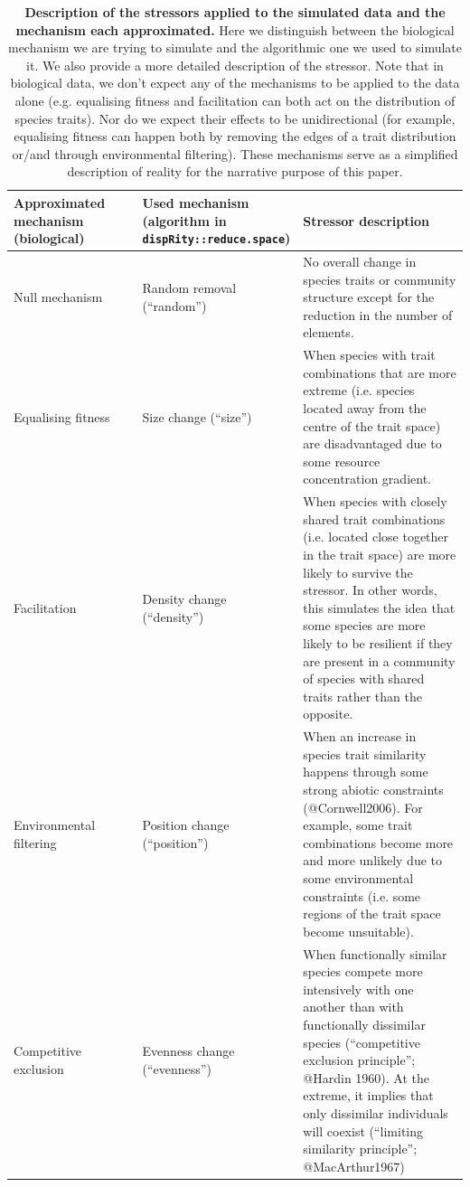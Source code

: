 \documentclass[12pt,letterpaper]{article}
\begin{document}
\begin{table}
\center
\scriptsize
\begin{tabular}{p{0.3\linewidth}|p{0.3\linewidth}|p{0.4\linewidth}}
\textbf{Approximated mechanism (biological)} & \textbf{Used mechanism (algorithm in \texttt{dispRity::reduce.space})} & \textbf{Stressor description}\\
\hline
  Null mechanism & Random removal (“random”) & No overall change in species traits or community structure except for the reduction in the number of elements.\\
  Equalising fitness & Size change (“size”) & When species with trait combinations that are more extreme (i.e. species located away from the centre of the trait space) are disadvantaged due to some resource concentration gradient. \\
  Facilitation & Density change (“density”) & When species with closely shared trait combinations (i.e. located close together in the trait space) are more likely to survive the stressor. In other words, this simulates the idea that some species are more likely to be resilient if they are present in a community of species with shared traits rather than the opposite.\\
  Environmental filtering & Position change (“position”) & When an increase in species trait similarity happens through some strong abiotic constraints (@Cornwell2006). For example, some trait combinations become more and more unlikely due to some environmental constraints (i.e. some regions of the trait space become unsuitable).\\
  Competitive exclusion & Evenness change (“evenness”) & When functionally similar species compete more intensively with one another than with functionally dissimilar species (``competitive exclusion principle''; @Hardin 1960). At the extreme, it implies that only dissimilar individuals will coexist (``limiting similarity principle''; @MacArthur1967)\\

    \end{tabular}
    \caption{\scriptsize{\textbf{Description of the stressors applied to the simulated data and the mechanism each approximated.} Here we distinguish between the biological mechanism we are trying to simulate and the algorithmic one we used to simulate it. We also provide a more detailed description of the stressor. Note that in biological data, we don’t expect any of the mechanisms to be applied to the data alone (e.g. equalising fitness and facilitation can both act on the distribution of species traits). Nor do we expect their effects to be unidirectional (for example, equalising fitness can happen both by removing the edges of a trait distribution or/and through environmental filtering). These mechanisms serve as a simplified description of reality for the narrative purpose of this paper.}
}
    \label{Tab:mechanisms}
\end{table}
\end{document}
